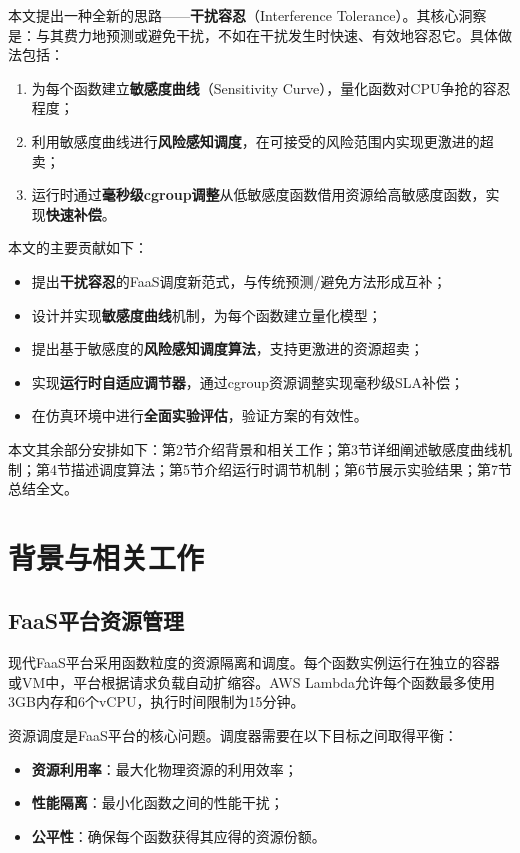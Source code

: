 \documentclass[11pt, a4paper, oneside]{article}
\begin{document}
本文提出一种全新的思路——\textbf{干扰容忍}（Interference Tolerance）。其核心洞察是：与其费力地预测或避免干扰，不如在干扰发生时快速、有效地容忍它。具体做法包括：

\begin{enumerate}
    \item 为每个函数建立\textbf{敏感度曲线}（Sensitivity Curve），量化函数对CPU争抢的容忍程度；
    \item 利用敏感度曲线进行\textbf{风险感知调度}，在可接受的风险范围内实现更激进的超卖；
    \item 运行时通过\textbf{毫秒级cgroup调整}从低敏感度函数借用资源给高敏感度函数，实现\textbf{快速补偿}。
\end{enumerate}

本文的主要贡献如下：

\begin{itemize}
    \item 提出\textbf{干扰容忍}的FaaS调度新范式，与传统预测/避免方法形成互补；
    \item 设计并实现\textbf{敏感度曲线}机制，为每个函数建立量化模型；
    \item 提出基于敏感度的\textbf{风险感知调度算法}，支持更激进的资源超卖；
    \item 实现\textbf{运行时自适应调节器}，通过cgroup资源调整实现毫秒级SLA补偿；
    \item 在仿真环境中进行\textbf{全面实验评估}，验证方案的有效性。
\end{itemize}

本文其余部分安排如下：第2节介绍背景和相关工作；第3节详细阐述敏感度曲线机制；第4节描述调度算法；第5节介绍运行时调节机制；第6节展示实验结果；第7节总结全文。

\section{背景与相关工作}

\subsection{FaaS平台资源管理}

现代FaaS平台采用函数粒度的资源隔离和调度。每个函数实例运行在独立的容器或VM中，平台根据请求负载自动扩缩容。AWS Lambda允许每个函数最多使用3GB内存和6个vCPU，执行时间限制为15分钟\citep{aws_lambda}。

资源调度是FaaS平台的核心问题。调度器需要在以下目标之间取得平衡：
\begin{itemize}
    \item \textbf{资源利用率}：最大化物理资源的利用效率；
    \item \textbf{性能隔离}：最小化函数之间的性能干扰；
    \item \textbf{公平性}：确保每个函数获得其应得的资源份额。
\end{itemize}
\end{document}
